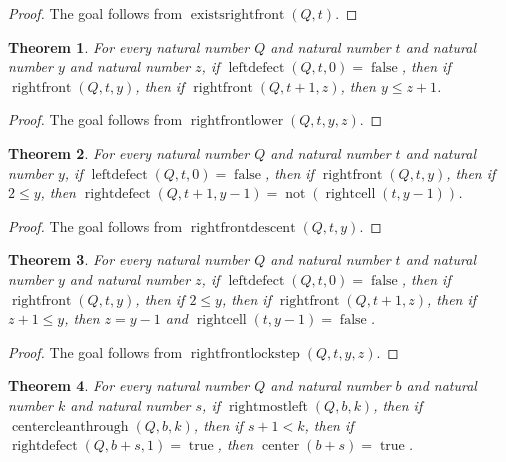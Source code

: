 \documentclass[11pt]{article}
\newtheorem{theorem}{Theorem}[section]
\theoremstyle{definition}
\begin{document}
\begin{proof}
The goal follows from \(\operatorname{existsrightfront}(Q, t)\).
\end{proof}
\begin{theorem}
\label{ll:observations:right-front-lower}
For every natural number \(Q\) and natural number \(t\) and natural number \(y\) and natural number \(z\), if \(\operatorname{leftdefect}(Q, t, 0) = \operatorname{false}\), then if \(\operatorname{rightfront}(Q, t, y)\), then if \(\operatorname{rightfront}(Q, t + 1, z)\), then \(y \le z + 1\).
\end{theorem}
\begin{proof}
The goal follows from \(\operatorname{rightfrontlower}(Q, t, y, z)\).
\end{proof}
\begin{theorem}
\label{ll:observations:right-front-descent}
For every natural number \(Q\) and natural number \(t\) and natural number \(y\), if \(\operatorname{leftdefect}(Q, t, 0) = \operatorname{false}\), then if \(\operatorname{rightfront}(Q, t, y)\), then if \(2 \le y\), then \(\operatorname{rightdefect}(Q, t + 1, y - 1) = \operatorname{not}(\operatorname{rightcell}(t, y - 1))\).
\end{theorem}
\begin{proof}
The goal follows from \(\operatorname{rightfrontdescent}(Q, t, y)\).
\end{proof}
\begin{theorem}
\label{ll:observations:right-front-lockstep}
For every natural number \(Q\) and natural number \(t\) and natural number \(y\) and natural number \(z\), if \(\operatorname{leftdefect}(Q, t, 0) = \operatorname{false}\), then if \(\operatorname{rightfront}(Q, t, y)\), then if \(2 \le y\), then if \(\operatorname{rightfront}(Q, t + 1, z)\), then if \(z + 1 \le y\), then \(z = y - 1\) and \(\operatorname{rightcell}(t, y - 1) = \operatorname{false}\).
\end{theorem}
\begin{proof}
The goal follows from \(\operatorname{rightfrontlockstep}(Q, t, y, z)\).
\end{proof}
\begin{theorem}
\label{ll:observations:leading-head-black-before-arrival}
For every natural number \(Q\) and natural number \(b\) and natural number \(k\) and natural number \(s\), if \(\operatorname{rightmostleft}(Q, b, k)\), then if \(\operatorname{centercleanthrough}(Q, b, k)\), then if \(s + 1 < k\), then if \(\operatorname{rightdefect}(Q, b + s, 1) = \operatorname{true}\), then \(\operatorname{center}(b + s) = \operatorname{true}\).
\end{theorem}
\end{document}
